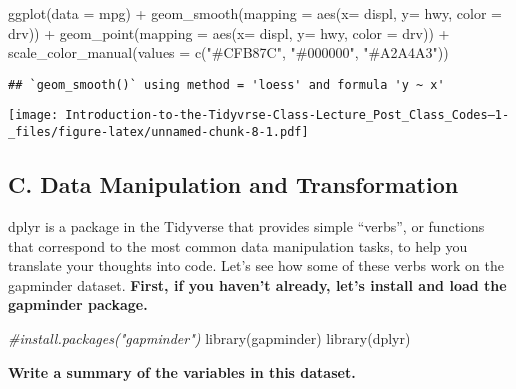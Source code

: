 \documentclass[
]{article}
\newenvironment{Shaded}{\begin{snugshade}}{\end{snugshade}}
\newcommand{\AttributeTok}[1]{\textcolor[rgb]{0.77,0.63,0.00}{#1}}
\newcommand{\CommentTok}[1]{\textcolor[rgb]{0.56,0.35,0.01}{\textit{#1}}}
\newcommand{\FunctionTok}[1]{\textcolor[rgb]{0.00,0.00,0.00}{#1}}
\newcommand{\NormalTok}[1]{#1}
\newcommand{\SpecialCharTok}[1]{\textcolor[rgb]{0.00,0.00,0.00}{#1}}
\newcommand{\StringTok}[1]{\textcolor[rgb]{0.31,0.60,0.02}{#1}}
\begin{document}
\begin{Shaded}
\begin{Highlighting}[]
\FunctionTok{ggplot}\NormalTok{(}\AttributeTok{data =}\NormalTok{ mpg) }\SpecialCharTok{+} 
  \FunctionTok{geom\_smooth}\NormalTok{(}\AttributeTok{mapping =} \FunctionTok{aes}\NormalTok{(}\AttributeTok{x=}\NormalTok{ displ, }\AttributeTok{y=}\NormalTok{ hwy, }\AttributeTok{color =}\NormalTok{ drv)) }\SpecialCharTok{+}
  \FunctionTok{geom\_point}\NormalTok{(}\AttributeTok{mapping =} \FunctionTok{aes}\NormalTok{(}\AttributeTok{x=}\NormalTok{ displ, }\AttributeTok{y=}\NormalTok{ hwy, }\AttributeTok{color =}\NormalTok{ drv)) }\SpecialCharTok{+}
\FunctionTok{scale\_color\_manual}\NormalTok{(}\AttributeTok{values =} \FunctionTok{c}\NormalTok{(}\StringTok{"\#CFB87C"}\NormalTok{, }\StringTok{"\#000000"}\NormalTok{, }\StringTok{"\#A2A4A3"}\NormalTok{))}
\end{Highlighting}
\end{Shaded}

\begin{verbatim}
## `geom_smooth()` using method = 'loess' and formula 'y ~ x'
\end{verbatim}

\texttt{[image: Introduction-to-the-Tidyvrse-Class-Lecture\_Post\_Class\_Codes--1-\_files/figure-latex/unnamed-chunk-8-1.pdf]}

\hypertarget{c.-data-manipulation-and-transformation}{%
\subsection{C. Data Manipulation and
Transformation}\label{c.-data-manipulation-and-transformation}}

dplyr is a package in the Tidyverse that provides simple ``verbs'', or
functions that correspond to the most common data manipulation tasks, to
help you translate your thoughts into code. Let's see how some of these
verbs work on the gapminder dataset. \textbf{First, if you haven't
already, let's install and load the gapminder package.}

\begin{Shaded}
\begin{Highlighting}[]
\CommentTok{\#install.packages("gapminder")}
\FunctionTok{library}\NormalTok{(gapminder)}
\FunctionTok{library}\NormalTok{(dplyr)}
\end{Highlighting}
\end{Shaded}

\textbf{Write a summary of the variables in this dataset. }
\end{document}
